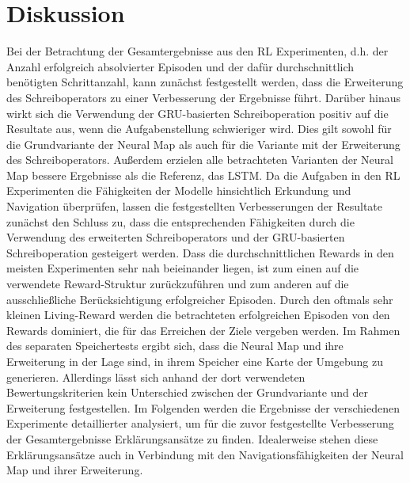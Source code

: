 \chapter{Diskussion}
\label{chap_disc}

Bei der Betrachtung der Gesamtergebnisse aus den RL Experimenten, d.h. der Anzahl erfolgreich absolvierter Episoden und der dafür durchschnittlich benötigten Schrittanzahl, kann zunächst festgestellt werden, dass die Erweiterung des Schreiboperators zu einer Verbesserung der Ergebnisse führt. Darüber hinaus wirkt sich die Verwendung der GRU-basierten Schreiboperation positiv auf die Resultate aus, wenn die Aufgabenstellung schwieriger wird. Dies gilt sowohl für die Grundvariante der Neural Map als auch für die Variante mit der Erweiterung des Schreiboperators. Außerdem erzielen alle betrachteten Varianten der Neural Map bessere Ergebnisse als die Referenz, das LSTM. Da die Aufgaben in den RL Experimenten die Fähigkeiten der Modelle hinsichtlich Erkundung und Navigation überprüfen, lassen die festgestellten Verbesserungen der Resultate zunächst den Schluss zu, dass die entsprechenden Fähigkeiten durch die Verwendung des erweiterten Schreiboperators und der GRU-basierten Schreiboperation gesteigert werden. Dass die durchschnittlichen Rewards in den meisten Experimenten sehr nah beieinander liegen, ist zum einen auf die verwendete Reward-Struktur zurückzuführen und zum anderen auf die ausschließliche Berücksichtigung erfolgreicher Episoden. Durch den oftmals sehr kleinen Living-Reward werden die betrachteten erfolgreichen Episoden von den Rewards dominiert, die für das Erreichen der Ziele vergeben werden. Im Rahmen des separaten Speichertests ergibt sich, dass die Neural Map und ihre Erweiterung in der Lage sind, in ihrem Speicher eine Karte der Umgebung zu generieren. Allerdings lässt sich anhand der dort verwendeten Bewertungskriterien kein Unterschied zwischen der Grundvariante und der Erweiterung festgestellen. Im Folgenden werden die Ergebnisse der verschiedenen Experimente detaillierter analysiert, um für die zuvor festgestellte Verbesserung der Gesamtergebnisse Erklärungsansätze zu finden. Idealerweise stehen diese Erklärungsansätze auch in Verbindung mit den Navigationsfähigkeiten der Neural Map und ihrer Erweiterung.


